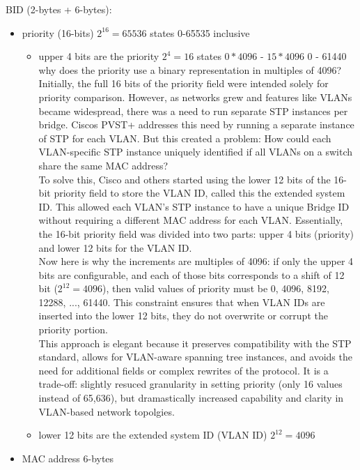 \documentclass{article}
\begin{document}
BID (2-bytes + 6-bytes):
	\begin{itemize}
		\item priority (16-bits) $2^16 = 65536$ states 0-65535 inclusive
			\begin{itemize}
				\item upper 4 bits are the priority $2^4 = 16$ states $0*4096$ - $15*4096$ 0 - 61440
					why does the priority use a binary representation in multiples of 4096?\\
						
					Initially, the full 16 bits of the priority field were intended solely for priority comparison. However, as networks grew and features like VLANs became widespread, there was a need to run separate STP instances per bridge. Ciscos PVST+ addresses this need by running a separate instance of STP for each VLAN. But this created a problem: How could each VLAN-specific STP instance uniquely identified if all VLANs on a switch share the same MAC address?\\

					To solve this, Cisco and others started using the lower 12 bits of the 16-bit priority field to store the VLAN ID, called this the extended system ID. This allowed each VLAN's STP instance to have a unique Bridge ID without requiring a different MAC address for each VLAN. Essentially, the 16-bit priority field was divided into two parts: upper 4 bits (priority) and lower 12 bits for the VLAN ID.\\

					Now here is why the increments are multiples of 4096: if only the upper 4 bits are configurable, and each of those bits corresponds to a shift of 12 bit ($2^12 = 4096$), then valid values of priority must be 0, 4096, 8192, 12288, ..., 61440. This constraint ensures that when VLAN IDs are inserted into the lower 12 bits, they do not overwrite or corrupt the priority portion.\\

					This approach is elegant because it preserves compatibility with the STP standard, allows for VLAN-aware spanning tree instances, and avoids the need for additional fields or complex rewrites of the protocol. It is a trade-off: slightly resuced granularity in setting priority (only 16 values instead of 65,636), but dramastically increased capability and clarity in VLAN-based network topolgies.

				\item lower 12 bits are the extended system ID (VLAN ID) $2^12 = 4096$
			\end{itemize}
		\item MAC address 6-bytes
	\end{itemize}
\end{document}
